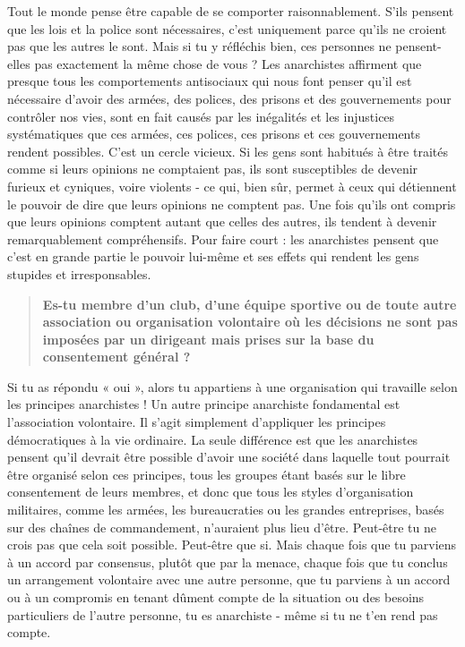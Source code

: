 Tout le monde pense être capable de se comporter raisonnablement. S'ils pensent que les lois et la police sont nécessaires, c'est uniquement parce qu'ils ne croient pas que les autres le sont. Mais si tu y réfléchis bien, ces personnes ne pensent-elles pas exactement la même chose de vous ? Les anarchistes affirment que presque tous les comportements antisociaux qui nous font penser qu'il est nécessaire d'avoir des armées, des polices, des prisons et des gouvernements pour contrôler nos vies, sont en fait causés par les inégalités et les injustices systématiques que ces armées, ces polices, ces prisons et ces gouvernements rendent possibles. C'est un cercle vicieux. Si les gens sont habitués à être traités comme si leurs opinions ne comptaient pas, ils sont susceptibles de devenir furieux et cyniques, voire violents - ce qui, bien sûr, permet à ceux qui détiennent le pouvoir de dire que leurs opinions ne comptent pas. Une fois qu'ils ont compris que leurs opinions comptent autant que celles des autres, ils tendent à devenir remarquablement compréhensifs. Pour faire court : les anarchistes pensent que c'est en grande partie le pouvoir lui-même et ses effets qui rendent les gens stupides et irresponsables.

\begin{quotation}
\textbf{Es-tu membre d'un club, d'une équipe sportive ou de toute autre association ou organisation volontaire où les décisions ne sont pas imposées par un dirigeant mais prises sur la base du consentement général ?}
\end{quotation}

Si tu as répondu « oui », alors tu appartiens à une organisation qui travaille selon les principes anarchistes ! Un autre principe anarchiste fondamental est l'association volontaire. Il s'agit simplement d'appliquer les principes démocratiques à la vie ordinaire. La seule différence est que les anarchistes pensent qu'il devrait être possible d'avoir une société dans laquelle tout pourrait être organisé selon ces principes, tous les groupes étant basés sur le libre consentement de leurs membres, et donc que tous les styles d'organisation militaires, comme les armées, les bureaucraties ou les grandes entreprises, basés sur des chaînes de commandement, n'auraient plus lieu d'être. Peut-être tu ne crois pas que cela soit possible. Peut-être que si. Mais chaque fois que tu parviens à un accord par consensus, plutôt que par la menace, chaque fois que tu conclus un arrangement volontaire avec une autre personne, que tu parviens à un accord ou à un compromis en tenant dûment compte de la situation ou des besoins particuliers de l'autre personne, tu es anarchiste - même si tu ne t’en rend pas compte.

